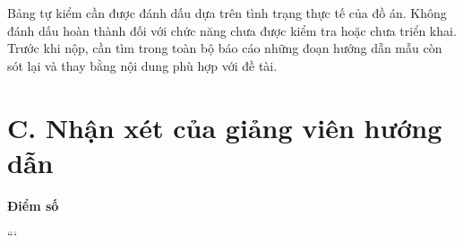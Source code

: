 \begin{luuy}
Bảng tự kiểm cần được đánh dấu dựa trên tình trạng thực tế của
đồ án. Không đánh dấu hoàn thành đối với chức năng chưa được
kiểm tra hoặc chưa triển khai. Trước khi nộp, cần tìm trong
toàn bộ báo cáo những đoạn hướng dẫn mẫu còn sót lại và thay
bằng nội dung phù hợp với đề tài.
\end{luuy}


\section*{C. Nhận xét của giảng viên hướng dẫn}
{}

\khungnhanxet[7.5cm]

\vspace{0.8em}

\noindent
\begin{minipage}[t]{0.5\textwidth}
    \color{daunavy}
    {\color{daumaroon}\bfseries Điểm số}

    \vspace{0.7em}

    \vspace{0.9em}
\end{minipage}
\hfill
{}
```